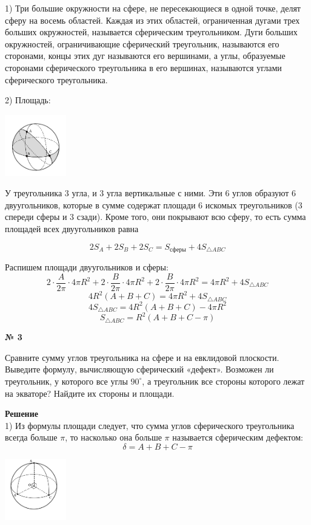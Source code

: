     1) Три большие окружности на сфере, не пересекающиеся в одной
    точке, делят сферу на восемь областей.
    Каждая из этих областей, ограниченная дугами трех больших
    окружностей, называется сферическим треугольником.
    Дуги больших окружностей, ограничивающие сферический треугольник, называются
    его сторонами, концы этих дуг называются его вершинами, а углы, образуемые сторонами сферического треугольника в его вершинах, называются углами сферического треугольника.

    2) Площадь:
    \begin{center}
        \includegraphics[width=0.2\textwidth]{images/Frame 24}\\
    \end{center}

    У треугольника 3 угла, и 3 угла вертикальные с ними.
    Эти 6 углов образуют 6 двуугольников, которые в сумме содержат площади 6 искомых треугольников
    (3 спереди сферы и 3 сзади).
    Кроме того, они покрывают всю сферу, то есть сумма площадей всех двуугольников равна

    \[
        2S_A + 2S_B + 2S_C = S_{\text{сферы}} + 4S_{\triangle ABC}
    \]

    Распишем площади двуугольников и сферы:
    \[
        2 \cdot \frac{A}{2\pi}\cdot 4\pi R^2 + 2 \cdot \frac{B}{2\pi}\cdot 4\pi R^2 + 2 \cdot \frac{B}{2\pi}\cdot 4\pi R^2 =
        4\pi R^2 + 4S_{\triangle ABC}
    \]
    \[
        4R^2(A + B + C) = 4\pi R^2 + 4S_{\triangle ABC}
    \]
    \[
        4S_{\triangle ABC} = 4R^2(A + B + C) - 4\pi R^2
    \]
    \[
        S_{\triangle ABC} = R^2(A + B + C - \pi)
    \]

    \begin{center}
        \textbf{№ 3}
    \end{center}
    Сравните сумму углов треугольника на сфере и на евклидовой плоскости.
    Выведите формулу, вычисляющую сферический «дефект».
    Возможен ли треугольник, у которого все углы $90^\circ$,
    а треугольник все стороны которого лежат на экваторе?
    Найдите их стороны и площади.

    \textbf{Решение}\\

    1) Из формулы площади следует, что сумма углов сферического треугольника всегда больше $\pi$,
    то насколько она больше $\pi$ называется сферическим дефектом:
    \[
        \delta = A + B + C - \pi
    \]
    \begin{center}
        \includegraphics[width=0.2\textwidth]{images/img6}\\
    \end{center}


